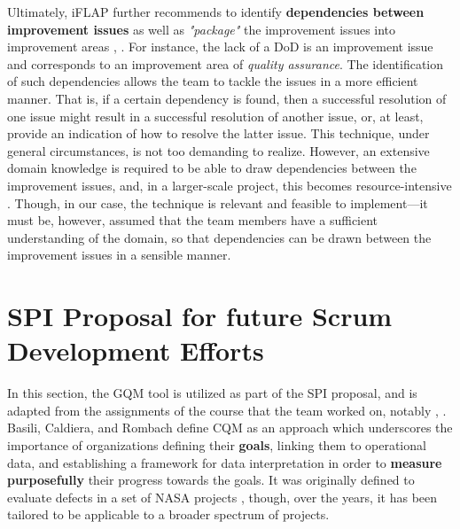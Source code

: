 \documentclass[conference]{IEEEtran}
\begin{document}
Ultimately, iFLAP further recommends to identify \textbf{dependencies between
improvement issues} as well as \textit{"package"} the improvement issues into
improvement areas \cite{Pettersson2008}, \cite{Malvius2009}. For instance, the
lack of a DoD is an improvement issue and corresponds to an improvement area of
\textit{quality assurance}. The identification of such dependencies allows the
team to tackle the issues in a more efficient manner. That is, if a certain
dependency is found, then a successful resolution of one issue might result in
a successful resolution of another issue, or, at least, provide an indication
of how to resolve the latter issue. This technique, under general
circumstances, is not too demanding to realize. However, an extensive domain
knowledge is required to be able to draw dependencies between the improvement
issues, and, in a larger-scale project, this becomes resource-intensive
\cite{Pettersson2008}. Though, in our case, the technique is relevant and
feasible to implement---it must be, however, assumed that the team members have
a sufficient understanding of the domain, so that dependencies can be drawn
between the improvement issues in a sensible manner.


\section{SPI Proposal for future Scrum Development Efforts}
\label{sec:proposal}


In this section, the {\selectfont GQM} tool is utilized as part
of the SPI proposal, and is adapted from the assignments of the course that
the team worked on, notably \cite{DIT348A3}, \cite{DIT348A4}. Basili, Caldiera,
and Rombach \cite{Caldiera1994} define CQM as an approach which underscores the
importance of organizations defining their \textbf{goals}, linking them to
operational data, and establishing a framework for data interpretation in order
to \textbf{measure purposefully} their progress towards the goals. It was
originally defined to evaluate defects in a set of NASA projects
\cite{Caldiera1994}, though, over the years, it has been tailored to be
applicable to a broader spectrum of projects.
\end{document}
